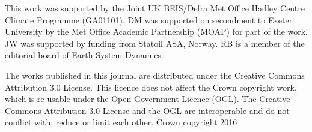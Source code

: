 \documentclass[esd, manuscript]{copernicus}
\begin{document}




\begin{acknowledgements}
This work was supported by the Joint UK BEIS/Defra Met Office Hadley Centre Climate Programme (GA01101). DM was supported on secondment to Exeter University by the Met Office Academic Partnership (MOAP) for part of the work. JW was supported by funding from Statoil ASA, Norway. RB is a member of the editorial board of Earth System Dynamics.
\end{acknowledgements}

The works published in this journal are distributed under the Creative Commons Attribution 3.0 License. This licence does not affect the Crown copyright work, which is re-usable under the Open Government Licence (OGL). The Creative Commons Attribution 3.0 License and the OGL are interoperable and do not conflict with, reduce or limit each other. 
\textcopyright Crown copyright 2016









\end{document}
